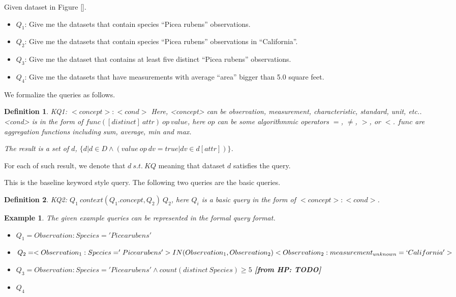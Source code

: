 \documentclass[conference]{IEEEtran}
\newtheorem{example}{Example}[section]
\newtheorem{definition}{Definition}[section]
\newcommand{\from}[2]{{\bf[{\sc from #1:} #2]}}
\begin{document}
Given dataset in Figure \ref{}. 


\begin{itemize}
\item $Q_1$: Give me the datasets that contain species ``Picea rubens'' observations.
\item $Q_2$: Give me the datasets that contain species ``Picea rubens''
  observations in ``California''. 
\item $Q_3$: Give me the dataset that contains at least five distinct ``Picea rubens'' observations.
\item $Q_4$: Give me the datasets that have measurements with average ``area''
bigger than 5.0 square feet. 
\end{itemize}


We formalize the queries as follows. 

\begin{definition}
KQ1: $<concept>:<cond>$
Here, <concept> can be observation, measurement, characteristic, standard,
unit, etc.. 
<cond> is in the form of $func([distinct]~attr)~op~value$, here $op$ can be some
algorithmmic operators $=$, $\neq$, $>$, or $<$. 
$func$ are aggregation functions including sum, average, min and max. 

The result is a set of $d$, $\{d|d\in D \wedge (value~op~dv = true |dv\in d[attr])\}$.
\end{definition}

For each of such result, we denote that $d~s.t.~KQ$ meaning that
dataset $d$ satisfies the query. 
 
This is the baseline keyword style query. 
The following two queries are the basic queries. 

\begin{definition}
KQ2: $Q_1~context(Q_1.concept,Q_2)~Q_2 $, here $Q_i$ is a basic query
in the form of $<concept>:<cond>$. 
\end{definition}

\begin{example}
The given example queries can be represented in the formal query
format. 
\begin{itemize}
\item $Q_1 = Observation: Species='Picea rubens'$
\item $Q_2 = <Observation_1: Species='Picea rubens'>
  IN(Observation_1,Observation_2) <Observation_2:
  measurement_{unknown}=`California'>$
\item $Q_3 = Observation: Species='Picea rubens' \wedge
  count(distinct~Species)\geq 5$ \from{HP}{TODO}
\item $Q_4$ 
\end{itemize}

\end{example}
\end{document}
